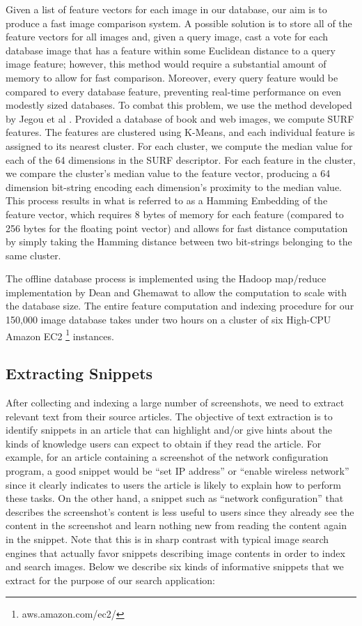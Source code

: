 \documentclass{www2010-submission}
\begin{document}
Given a list of feature vectors for each image in our database, our
aim is to produce a fast image comparison system.  A possible solution
is to store all of the feature vectors for all images and, given a
query image, cast a vote for each database image that has a feature
within some Euclidean distance to a query image feature; however, this
method would require a substantial amount of memory to allow for fast
comparison.  Moreover, every query feature would be compared to every
database feature, preventing real-time performance on even modestly
sized databases.  To combat this problem, we use the method developed
by Jegou et al \cite{Schmid1478419}.  Provided a database of book and web images,
we compute SURF features. The features are clustered using K-Means,
and each individual feature is assigned to its nearest cluster.  For
each cluster, we compute the median value for each of the 64
dimensions in the SURF descriptor.  For each feature in the cluster,
we compare the cluster's median value to the feature vector, producing
a 64 dimension bit-string encoding each dimension's proximity to the
median value.  This process results in what is referred to as a
Hamming Embedding of the feature vector, which requires 8 bytes of
memory for each feature (compared to 256 bytes for the floating point
vector) and allows for fast distance computation by simply taking the
Hamming distance between two bit-strings belonging to the same
cluster.

The offline database process is implemented using the Hadoop
map/reduce implementation by Dean and Ghemawat \cite{Ghemaqat1327492} to allow the
computation to scale with the database size.  The entire feature
computation and indexing procedure for our 150,000 image database
takes under two hours on a cluster of six High-CPU Amazon EC2 \footnote{aws.amazon.com/ec2/}
instances.

\subsection{Extracting Snippets}
\label{sec:extracting_snippets}

After collecting and indexing a large number of screenshots, we need
to extract relevant text from their source articles. The objective of
text extraction is to identify snippets in an article that can
highlight and/or give hints about the kinds of knowledge users can
expect to obtain if they read the article. For example, for an article
containing a screenshot of the network configuration program, a good
snippet would be ``set IP address'' or ``enable wireless network''
since it clearly indicates to users the article is likely to explain
how to perform these tasks. On the other hand, a snippet such as
``network configuration'' that describes the screenshot's content is
less useful to users since they already see the content in the
screenshot and learn nothing new from reading the content again in the
snippet. Note that this is in sharp contrast with typical image search
engines that actually favor snippets describing image contents in
order to index and search images. Below we describe six kinds of
informative snippets that we extract for the purpose of our search
application:
\end{document}
